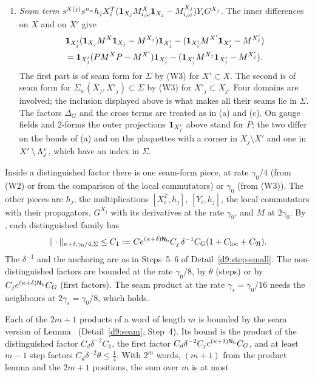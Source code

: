 \begin{detail}
\begin{step}
\begin{enumerate}[label=(\alph*)]
\begin{itemize}
\end{itemize}
The divergences of the regrouping agree exactly: $PD^T_X=\one_{X'}D^T=D^T_{X'}$ and $PD^T_{X_j}=\one_{X'_j}D^T=D^T_{X'_j}$.
\item \emph{Seam term} $s^{X(j)}s^{n_\omega}h_jX_i^T(\mathbf 1_{X_j}M^X_{i,\omega}\mathbf 1_{X_j}-M^{X_j}_{i,\omega})Y_iG^{X_j}$. The inner differences on $X$ and on $X'$ give
\begin{multline*}
\mathbf 1_{X'_j}(\mathbf 1_{X_j}M^X\mathbf 1_{X_j}-M^{X_j})\mathbf 1_{X'_j}-(\mathbf 1_{X'_j}M^{X'}\mathbf 1_{X'_j}-M^{X'_j})\\
=\mathbf 1_{X'_j}(PM^XP-M^{X'})\mathbf 1_{X'_j}-(\mathbf 1_{X'_j}M^{X_j}\mathbf 1_{X'_j}-M^{X'_j}) .
\end{multline*}
The first part is of seam form for $\Sigma$ by (W3) for $X'\subset X$. The second is of seam form for $\Sigma_w(X_j,X'_j)\subset\Sigma$ by (W3) for $X'_j\subset X_j$. Four domains are involved; the inclusion displayed above is what makes all their seams lie in $\Sigma$. The factors $\Delta_G$ and the cross terms are treated as in (a) and (c). On gauge fields and $2$-forms the outer projections $\mathbf 1_{X'_j}$ above stand for $P$; the two differ on the bonds of (a) and on the plaquettes with a corner in $X_j\setminus X'$ and one in $X'\setminus\Lambda^v_j$, which have an index in $\Sigma$.
\end{enumerate}
\end{step}
\begin{step}[Rates]
Inside a distinguished factor there is one seam-form piece, at rate $\gamma_0/4$ (from (W2) or from the comparison of the local commutators) or $\gamma_0$ (from (W3)). The other pieces are $h_j$, the multiplications $[X_i^T,h_j]$, $[Y_i,h_j]$, the local commutators with their propagators, $G^{X_j}$ with its derivatives at the rate $\gamma_0$, and $M$ at $2\gamma_0$. By , each distinguished family has
\[
\|\cdot\|_{\kappa+\delta,\gamma_0/4,\Sigma}\le C_1:=Ce^{(\kappa+\delta)\mathsf N_{\rm b}}C_j\,\delta^{-1}C_G(1+C_{\rm loc}+C_{\mathfrak N}) .
\]
The $\delta^{-1}$ and the anchoring are as in Steps~5--6 of Detail~\ref{d9:step-small}. The non-distinguished factors are bounded at the rate $\gamma_0/8$, by $\theta$ (steps) or by $C_je^{(\kappa+\delta)\mathsf N_{\rm b}}C_G$ (first factors). The seam product at the rate $\gamma_s=\gamma_0/16$ needs the neighbours at $2\gamma_s=\gamma_0/8$, which holds.
\end{step}
\begin{step}[Summation]
Each of the $2m+1$ products of a word of length $m$ is bounded by the seam version of Lemma~ (Detail~\ref{d9:seam}, Step~4). Its bound is the product of the distinguished factor $C_d\delta^{-2}C_1$, the first factor $C_d\delta^{-2}C_je^{(\kappa+\delta)\mathsf N_{\rm b}}C_G$, and at least $m-1$ step factors $C_d\delta^{-2}\theta\le\frac14$. With $2^m$ words, $(m+1)$ from the product lemma and the $2m+1$ positions, the sum over $m$ is at most

\end{step}
\end{detail}
